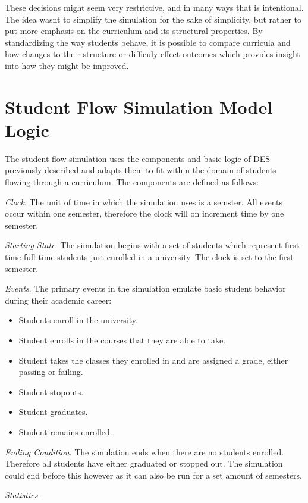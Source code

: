 \documentclass[botnum, fleqn]{unmeethesis}
\begin{document}
These decisions might seem very restrictive, and in many ways that is intentional. The idea wasnt to simplify the simulation for the sake of simplicity, but rather to put more emphasis on the curriculum and its structural properties. By standardizing the way students behave, it is possible to compare curricula and how changes to their structure or difficuly effect outcomes which provides insight into how they might be improved.

\section{Student Flow Simulation Model Logic}
The student flow simulation uses the components and basic logic of DES previously described and adapts them to fit within the domain of students flowing through a curriculum. The components are defined as follows:

\textit{Clock}. The unit of time in which the simulation uses is a semster. All events occur within one semester, therefore the clock will on increment time by one semester.

\textit{Starting State}. The simulation begins with a set of students which represent first-time full-time students just enrolled in a university. The clock is set to the first semester.

\textit{Events}. The primary events in the simulation emulate basic student behavior during their academic career:
\begin{itemize}
  \item Students enroll in the university.
  \item Student enrolls in the courses that they are able to take.
  \item Student takes the classes they enrolled in and are assigned a grade, either passing or failing.
  \item Student stopouts.
  \item Student graduates.
  \item Student remains enrolled.
\end{itemize}

\textit{Ending Condition}. The simulation ends when there are no students enrolled. Therefore all students have either graduated or stopped out. The simulation could end before this however as it can also be run for a set amount of semesters.

\textit{Statistics}.
\end{document}
